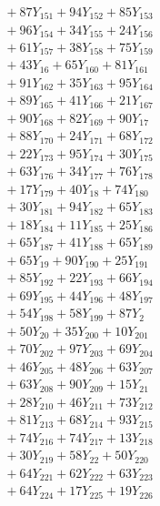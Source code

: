 \documentclass[a4paper,10pt]{article}
\begin{document}
{\begin{align}
&\quad  + 87Y_{151} + 94Y_{152} + 85Y_{153} \\[0.5ex]
&\quad  + 96Y_{154} + 34Y_{155} + 24Y_{156} \\[0.5ex]
&\quad  + 61Y_{157} + 38Y_{158} + 75Y_{159} \\[0.5ex]
&\quad  + 43Y_{16} + 65Y_{160} + 81Y_{161} \\[0.5ex]
&\quad  + 91Y_{162} + 35Y_{163} + 95Y_{164} \\[0.5ex]
&\quad  + 89Y_{165} + 41Y_{166} + 21Y_{167} \\[0.5ex]
&\quad  + 90Y_{168} + 82Y_{169} + 90Y_{17} \\[0.5ex]
&\quad  + 88Y_{170} + 24Y_{171} + 68Y_{172} \\[0.5ex]
&\quad  + 22Y_{173} + 95Y_{174} + 30Y_{175} \\[0.5ex]
&\quad  + 63Y_{176} + 34Y_{177} + 76Y_{178} \\[0.5ex]
&\quad  + 17Y_{179} + 40Y_{18} + 74Y_{180} \\[0.5ex]
&\quad  + 30Y_{181} + 94Y_{182} + 65Y_{183} \\[0.5ex]
&\quad  + 18Y_{184} + 11Y_{185} + 25Y_{186} \\[0.5ex]
&\quad  + 65Y_{187} + 41Y_{188} + 65Y_{189} \\[0.5ex]
&\quad  + 65Y_{19} + 90Y_{190} + 25Y_{191} \\[0.5ex]
&\quad  + 85Y_{192} + 22Y_{193} + 66Y_{194} \\[0.5ex]
&\quad  + 69Y_{195} + 44Y_{196} + 48Y_{197} \\[0.5ex]
&\quad  + 54Y_{198} + 58Y_{199} + 87Y_{2} \\[0.5ex]
&\quad  + 50Y_{20} + 35Y_{200} + 10Y_{201} \\[0.5ex]
&\quad  + 70Y_{202} + 97Y_{203} + 69Y_{204} \\[0.5ex]
&\quad  + 46Y_{205} + 48Y_{206} + 63Y_{207} \\[0.5ex]
&\quad  + 63Y_{208} + 90Y_{209} + 15Y_{21} \\[0.5ex]
&\quad  + 28Y_{210} + 46Y_{211} + 73Y_{212} \\[0.5ex]
&\quad  + 81Y_{213} + 68Y_{214} + 93Y_{215} \\[0.5ex]
&\quad  + 74Y_{216} + 74Y_{217} + 13Y_{218} \\[0.5ex]
&\quad  + 30Y_{219} + 58Y_{22} + 50Y_{220} \\[0.5ex]
&\quad  + 64Y_{221} + 62Y_{222} + 63Y_{223} \\[0.5ex]
&\quad  + 64Y_{224} + 17Y_{225} + 19Y_{226} \\[0.5ex]

\end{align}}
\end{document}
